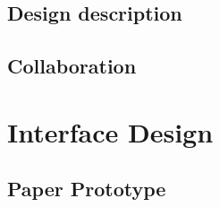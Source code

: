 

\section{Design description}


\section{Collaboration}


\chapter{Interface Design}


\section{Paper Prototype}



